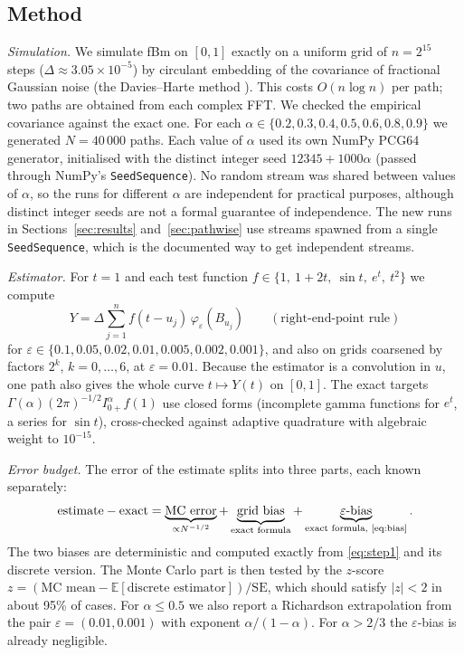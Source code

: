 \documentclass[11pt]{article}
\theoremstyle{remark}
\theoremstyle{definition}
\newcommand{\E}{\mathbb{E}}
\newcommand{\Ia}{I^{\alpha}_{0+}}
\begin{document}
\subsection{Method}\label{sec:method}
\emph{Simulation.} We simulate fBm on $[0,1]$ exactly on a uniform grid of $n=2^{15}$ steps ($\Delta\approx3.05\times10^{-5}$) by circulant embedding of the covariance of fractional Gaussian noise (the Davies--Harte method \cite{DH87,DN97,WC94}). This costs $O(n\log n)$ per path; two paths are obtained from each complex FFT. We checked the empirical covariance against the exact one. For each $\alpha\in\{0.2,0.3,0.4,0.5,0.6,0.8,0.9\}$ we generated $N=40\,000$ paths. Each value of $\alpha$ used its own NumPy PCG64 generator, initialised with the distinct integer seed $12345+1000\alpha$ (passed through NumPy's \texttt{SeedSequence}). No random stream was shared between values of $\alpha$, so the runs for different $\alpha$ are independent for practical purposes, although distinct integer seeds are not a formal guarantee of independence. The new runs in Sections~\ref{sec:results} and~\ref{sec:pathwise} use streams spawned from a single \texttt{SeedSequence}, which is the documented way to get independent streams.

\emph{Estimator.} For $t=1$ and each test function $f\in\{1,\ 1+2t,\ \sin t,\ e^t,\ t^2\}$ we compute
\[
Y=\Delta\sum_{j=1}^{n} f(t-u_j)\,\varphi_\varepsilon(B_{u_j})\qquad(\text{right-end-point rule})
\]
for $\varepsilon\in\{0.1,0.05,0.02,0.01,0.005,0.002,0.001\}$, and also on grids coarsened by factors $2^k$, $k=0,\dots,6$, at $\varepsilon=0.01$. Because the estimator is a convolution in $u$, one path also gives the whole curve $t\mapsto Y(t)$ on $[0,1]$. The exact targets $\Gamma(\alpha)(2\pi)^{-1/2}\Ia f(1)$ use closed forms (incomplete gamma functions for $e^t$, a series for $\sin t$), cross-checked against adaptive quadrature with algebraic weight to $10^{-15}$.

\emph{Error budget.} The error of the estimate splits into three parts, each known separately:
\[
\text{estimate}-\text{exact}=\underbrace{\text{MC error}}_{\propto N^{-1/2}}+\underbrace{\text{grid bias}}_{\text{exact formula}}+\underbrace{\varepsilon\text{-bias}}_{\text{exact formula, \eqref{eq:bias}}} .
\]
The two biases are deterministic and computed exactly from \eqref{eq:step1} and its discrete version. The Monte Carlo part is then tested by the $z$-score $z=(\text{MC mean}-\E[\text{discrete estimator}])/\mathrm{SE}$, which should satisfy $|z|<2$ in about 95\% of cases. For $\alpha\le0.5$ we also report a Richardson extrapolation from the pair $\varepsilon=(0.01,0.001)$ with exponent $\alpha/(1-\alpha)$. For $\alpha>2/3$ the $\varepsilon$-bias is already negligible.
\end{document}
